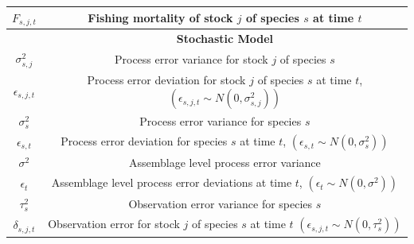 \documentclass[]{scrartcl}
\begin{document}
\begin{table}[htbp]
\begin{center}
\begin{tabular}{c|c}
$F_{s,j,t}$ & Fishing mortality of stock $j$ of species $s$ at time $t$ \\
\hline
& \textbf{ Stochastic Model } \\
$\sigma_{s,j}^2$ & Process error variance for stock $j$ of species $s$ \\
$\epsilon_{s,j,t}$ & Process error deviation for stock $j$ of species $s$ at time $t$, $\left( \epsilon_{s,j,t} \sim N (0, \sigma_{s,j}^2) \right)$ \\
$\sigma_{s}^2$ & Process error variance for species $s$ \\
$\epsilon_{s,t}$ & Process error deviation for species $s$ at time $t$, $\left( \epsilon_{s,t} \sim N (0, \sigma_s^2) \right)$ \\
$\sigma^2$ & Assemblage level process error variance  \\
$\epsilon_{t}$ & Assemblage level process error deviations at time $t$, $\left( \epsilon_{t} \sim N (0, \sigma^2) \right)$ \\
$\tau_s^2$ & Observation error variance for species $s$ \\
$\delta_{s,j,t}$ & Observation error for stock $j$ of species $s$ at time $t$ $\left(\epsilon_{s,j,t} \sim N (0, \tau_s^2) \right)$ \\
\hline
\end{tabular}
\end{center}
\end{table}

\newpage
\end{document}
